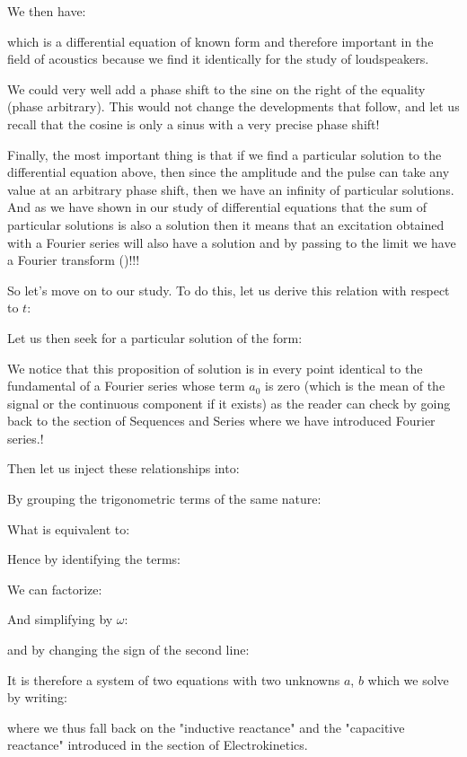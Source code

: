 	We then have:
	
	which is a differential equation of known form and therefore important in the field of acoustics because we find it identically for the study of loudspeakers.

	We could very well add a phase shift to the sine on the right  of the equality (phase arbitrary). This would not change the developments that follow, and let us recall that the cosine is only a sinus with a very precise phase shift!

	Finally, the most important thing is that if we find a particular solution to the differential equation above, then since the amplitude and the pulse can take any value at an arbitrary phase shift, then we have an infinity of particular solutions. And as we have shown in our study of differential equations that the sum of particular solutions is also a solution then it means that an excitation obtained with a Fourier series will also have a solution and by passing to the limit we have a Fourier transform ()!!!

	So let's move on to our study. To do this, let us derive this relation with respect to $t$:
	
	Let us then seek for a particular solution of the form:
	
	We notice that this proposition of solution is in every point identical to the fundamental of a Fourier series whose term $a_0$ is zero (which is the mean of the signal or the continuous component if it exists) as the reader can check by going back to the section of Sequences and Series where we have introduced Fourier series.!

	Then let us inject these relationships into:
	
	By grouping the trigonometric terms of the same nature:
	
	What is equivalent to:
	
	Hence by identifying the terms:
	
	We can factorize:
	
	And simplifying by $\omega$:
	
	and by changing the sign of the second line:
	
	It is therefore a system of two equations with two unknowns $a$, $b$ which we solve by writing:
	
	where we thus fall back on the "inductive reactance" and the "capacitive reactance" introduced in the section of Electrokinetics.


